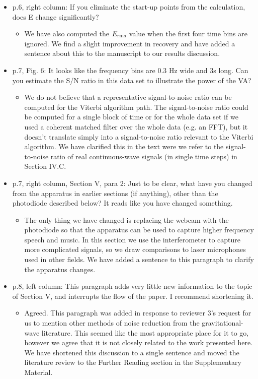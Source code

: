 \documentclass[a4paper, 10pt]{letter}
\begin{document}
\begin{itemize}
\item p.6, right column: If you eliminate the start-up points from the calculation, does E change significantly?
\begin{itemize}
\item We have also computed the $E_{\rm rms}$ value when the first four time bins are ignored. We find a slight improvement in recovery and have added a sentence about this to the manuscript to our results discussion. 
\end{itemize}

\item p.7, Fig. 6: It looks like the frequency bins are 0.3 Hz wide and 3s long. Can you estimate the S/N ratio in this data set to illustrate the power of the VA?
\begin{itemize}
\item 
We do not believe that a representative signal-to-noise ratio can be computed for the Viterbi algorithm path. 
The signal-to-noise ratio could be computed for a single block of time or for the whole data set if we used a coherent matched filter over the whole data (e.g. an FFT), but it doesn't translate simply into a signal-to-noise ratio relevant to the Viterbi algorithm. 
We have clarified this in the text were we refer to the signal-to-noise ratio of real continuous-wave signals (in single time steps) in Section IV.C. 
\end{itemize}

\item p.7, right column, Section V, para 2: Just to be clear, what have you changed from the apparatus in earlier sections (if anything), other than the photodiode described below? It reads like you have changed something.
\begin{itemize}
\item The only thing we have changed is replacing the webcam with the photodiode so that the apparatus can be used to capture higher frequency speech and music. In this section we use the interferometer to capture more complicated signals, so we draw comparisons to laser microphones used in other fields. We have added a sentence to this paragraph to clarify the apparatus changes. 
\end{itemize}

\item p.8, left column: This paragraph adds very little new information to the topic of Section V, and interrupts the flow of the paper. I recommend shortening it. 
\begin{itemize}
\item Agreed. This paragraph was added in response to reviewer 3's request for us to mention other methods of noise reduction from the gravitational-wave literature. This seemed like the most appropriate place for it to go, however we agree that it is not closely related to the work presented here. We have shortened this discussion to a single sentence and moved the literature review to the Further Reading section in the Supplementary Material. 
\end{itemize}


\end{itemize}
\end{document}

